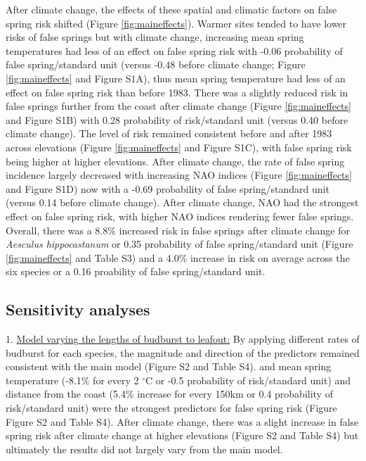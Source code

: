 \documentclass{article}\usepackage[]{graphicx}\usepackage[]{color}
\begin{document}
After climate change, the effects of these spatial and climatic factors on false spring risk shifted (Figure \ref{fig:maineffects}). Warmer sites tended to have lower risks of false springs but with climate change, increasing mean spring temperatures had less of an effect on false spring risk with -0.06 probability of false spring/standard unit (versus -0.48 before climate change; Figure \ref{fig:maineffects} and Figure S1A), thus mean spring temperature had less of an effect on false spring risk than before 1983. There was a slightly reduced risk in false springs further from the coast after climate change (Figure \ref{fig:maineffects} and Figure S1B) with 0.28 probability of risk/standard unit (versus 0.40 before climate change). The level of risk remained consistent before and after 1983 across elevations (Figure \ref{fig:maineffects} and Figure S1C), with false spring risk being higher at higher elevations. After climate change, the rate of false spring incidence largely decreased with increasing NAO indices (Figure \ref{fig:maineffects} and Figure S1D) now with a -0.69 probability of false spring/standard unit (versus 0.14 before climate change). After climate change, NAO had the strongest effect on false spring risk, with higher NAO indices rendering fewer false springs. Overall, there was a 8.8\% increased risk in false springs after climate change for \textit{Aesculus hippocastanum} or 0.35 probability of false spring/standard unit (Figure \ref{fig:maineffects} and Table S3) and a 4.0\% increase in risk on average across the six species or a 0.16 proability of false spring/standard unit.

\subsection*{Sensitivity analyses}
1. \underline{Model varying the lengths of budburst to leafout:} By applying different rates of budburst for each species, the magnitude and direction of the predictors remained consistent with the main model (Figure S2 and Table S4). and mean spring temperature (-8.1\% for every 2 $^\circ$C or -0.5 probability of risk/standard unit) and distance from the coast (5.4\% increase for every 150km or 0.4 probability of risk/standard unit) were the strongest predictors for false spring risk (Figure Figure S2 and Table S4). After climate change, there was a slight increase in false spring risk after climate change at higher elevations (Figure S2 and Table S4) but ultimately the results did not largely vary from the main model. 
\end{document}
